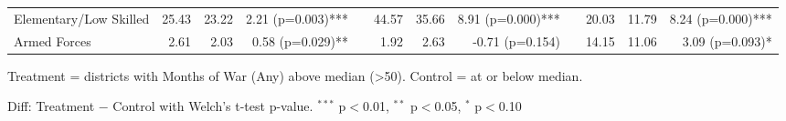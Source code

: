 \begin{table}[htbp]
\begin{tabular}{l rrr c rrr c rrr}
\quad Elementary/Low Skilled & 25.43 & 23.22 & 2.21 (p=0.003)*** &  & 44.57 & 35.66 & 8.91 (p=0.000)*** &  & 20.03 & 11.79 & 8.24 (p=0.000)*** \\
\quad Armed Forces & 2.61 & 2.03 & 0.58 (p=0.029)** &  & 1.92 & 2.63 & -0.71 (p=0.154) &  & 14.15 & 11.06 & 3.09 (p=0.093)* \\
\bottomrule
\end{tabular}
\begin{tablenotes}
\small
\item Treatment = districts with Months of War (Any) above median (>50). Control = at or below median.
\item Diff: Treatment $-$ Control with Welch's t-test p-value. $^{{***}}$ p$<$0.01, $^{{**}}$ p$<$0.05, $^{{*}}$ p$<$0.10
\end{tablenotes}
\end{table}

\clearpage

